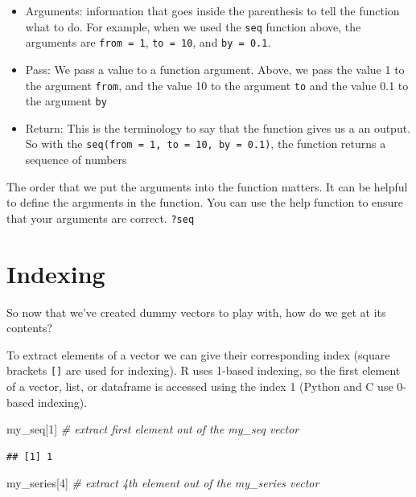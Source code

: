 \documentclass[
]{book}
\newenvironment{Shaded}{\begin{snugshade}}{\end{snugshade}}
\newcommand{\CommentTok}[1]{\textcolor[rgb]{0.56,0.35,0.01}{\textit{#1}}}
\newcommand{\DecValTok}[1]{\textcolor[rgb]{0.00,0.00,0.81}{#1}}
\newcommand{\NormalTok}[1]{#1}
\providecommand{\tightlist}{%
  \setlength{\itemsep}{0pt}\setlength{\parskip}{0pt}}
\begin{document}
\begin{itemize}
\tightlist
\item
  Arguments: information that goes inside the parenthesis to tell the function what to do. For example, when we used the \texttt{seq} function above, the arguments are \texttt{from\ =\ 1}, \texttt{to\ =\ 10}, and \texttt{by\ =\ 0.1}.
\item
  Pass: We pass a value to a function argument. Above, we pass the value 1 to the argument \texttt{from}, and the value 10 to the argument \texttt{to} and the value 0.1 to the argument \texttt{by}
\item
  Return: This is the terminology to say that the function gives us a an output. So with the \texttt{seq(from\ =\ 1,\ to\ =\ 10,\ by\ =\ 0.1)}, the function returns a sequence of numbers
\end{itemize}

The order that we put the arguments into the function matters. It can be helpful to define the arguments in the function. You can use the help function to ensure that your arguments are correct.
\texttt{?seq}

\section{Indexing}\label{indexing}

So now that we've created dummy vectors to play with, how do we get at its contents?

To extract elements of a vector we can give their corresponding index (square brackets \texttt{{[}{]}} are used for indexing). R uses 1-based indexing, so the
first element of a vector, list, or dataframe is accessed using the index 1 (Python and C use 0-based indexing).

\begin{Shaded}
\begin{Highlighting}[]
\NormalTok{my\_seq[}\DecValTok{1}\NormalTok{] }\CommentTok{\# extract first element out of the my\_seq vector}
\end{Highlighting}
\end{Shaded}

\begin{verbatim}
## [1] 1
\end{verbatim}

\begin{Shaded}
\begin{Highlighting}[]
\NormalTok{my\_series[}\DecValTok{4}\NormalTok{] }\CommentTok{\# extract 4th element out of the my\_series vector}
\end{Highlighting}
\end{Shaded}
\end{document}
